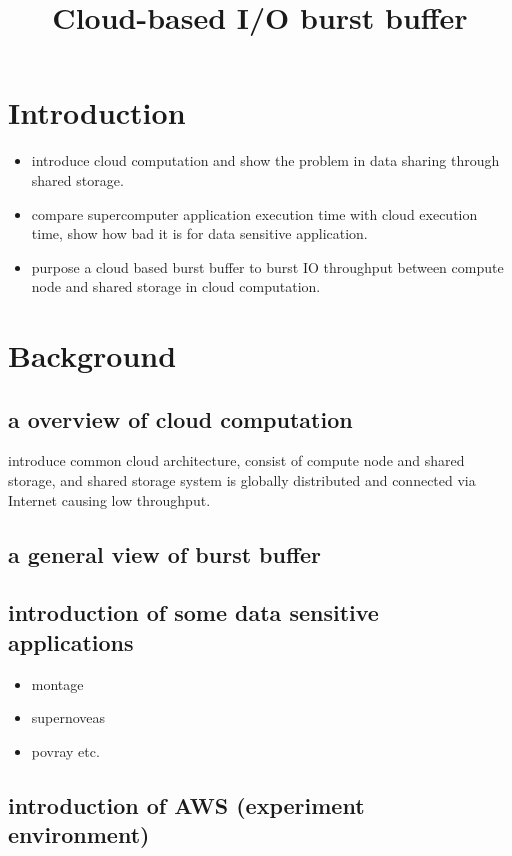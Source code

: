\documentclass{article}
\begin{document}
\title{Cloud-based I/O burst buffer}
\maketitle

\section{Introduction}
\begin{itemize}
	\item introduce cloud computation and show the problem in data sharing through shared storage.
	\item compare supercomputer application execution time with cloud execution time, show how bad it is for data sensitive application.
	\item purpose a cloud based burst buffer to burst IO throughput between compute node and shared storage in cloud computation.
\end{itemize}

\section{Background}
\subsection{a overview of cloud computation}
introduce common cloud architecture, consist of compute node and shared storage, and shared storage system is globally distributed and connected via Internet causing low throughput.
\subsection{a general view of burst buffer}
\subsection{introduction of some data sensitive applications}
	\begin{itemize}
		\item montage
		\item supernoveas
		\item povray etc.
	\end{itemize}
\subsection{introduction of AWS (experiment environment)}
\end{document}
